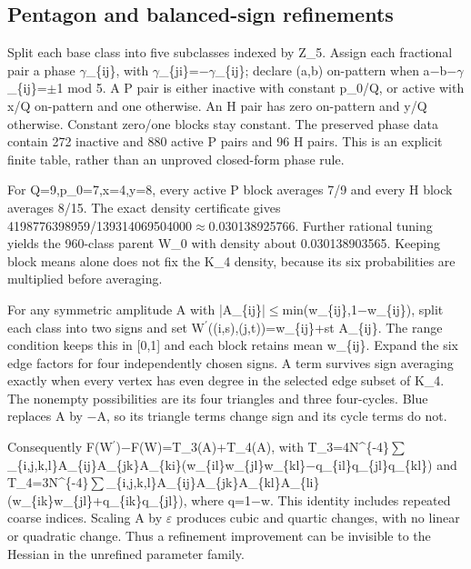 \documentclass[11pt,a4paper]{article}
\begin{document}
\subsection{Pentagon and balanced-sign refinements}
Split each base class into five subclasses indexed by Z\_5. Assign each fractional pair a phase \ensuremath{\gamma}\_\{ij\}, with \ensuremath{\gamma}\_\{ji\}=\ensuremath{-}\ensuremath{\gamma}\_\{ij\}; declare (a,b) on-pattern when a\ensuremath{-}b\ensuremath{-}\ensuremath{\gamma}\_\{ij\}=\ensuremath{\pm}1 mod 5. A P pair is either inactive with constant p\_0/Q, or active with x/Q on-pattern and one otherwise. An H pair has zero on-pattern and y/Q otherwise. Constant zero/one blocks stay constant. The preserved phase data contain 272 inactive and 880 active P pairs and 96 H pairs. This is an explicit finite table, rather than an unproved closed-form phase rule.

For Q=9,p\_0=7,x=4,y=8, every active P block averages 7/9 and every H block averages 8/15. The exact density certificate gives 4198776398959/139314069504000\ensuremath{\approx}0.030138925766. Further rational tuning yields the 960-class parent W\_0 with density about 0.030138903565. Keeping block means alone does not fix the K\_4 density, because its six probabilities are multiplied before averaging.

For any symmetric amplitude A with |A\_\{ij\}|\ensuremath{\leq}min(w\_\{ij\},1\ensuremath{-}w\_\{ij\}), split each class into two signs and set W\ensuremath{^{\prime}}((i,s),(j,t))=w\_\{ij\}+st A\_\{ij\}. The range condition keeps this in [0,1] and each block retains mean w\_\{ij\}. Expand the six edge factors for four independently chosen signs. A term survives sign averaging exactly when every vertex has even degree in the selected edge subset of K\_4. The nonempty possibilities are its four triangles and three four-cycles. Blue replaces A by \ensuremath{-}A, so its triangle terms change sign and its cycle terms do not.

Consequently F(W\ensuremath{^{\prime}})\ensuremath{-}F(W)=T\_3(A)+T\_4(A), with T\_3=4N\textasciicircum{}\{-4\}\ensuremath{\sum}\_\{i,j,k,l\}A\_\{ij\}A\_\{jk\}A\_\{ki\}(w\_\{il\}w\_\{jl\}w\_\{kl\}\ensuremath{-}q\_\{il\}q\_\{jl\}q\_\{kl\}) and T\_4=3N\textasciicircum{}\{-4\}\ensuremath{\sum}\_\{i,j,k,l\}A\_\{ij\}A\_\{jk\}A\_\{kl\}A\_\{li\}(w\_\{ik\}w\_\{jl\}+q\_\{ik\}q\_\{jl\}), where q=1\ensuremath{-}w. This identity includes repeated coarse indices. Scaling A by \ensuremath{\varepsilon} produces cubic and quartic changes, with no linear or quadratic change. Thus a refinement improvement can be invisible to the Hessian in the unrefined parameter family.
\end{document}
